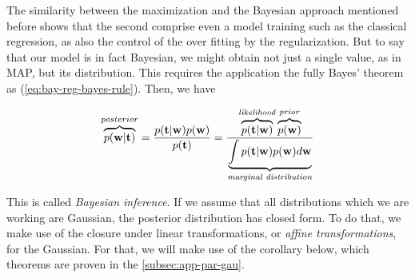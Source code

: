 \documentclass[11pt]{article} %
\begin{document}
The similarity between the maximization and the Bayesian approach mentioned before shows that the second comprise even a model training such as the classical regression, as also the control of the over fitting by the regularization. But to say that our model is in fact Bayesian, we might obtain not just a single value, as in MAP, but its distribution. This requires the application the fully Bayes' theorem as (\ref{eq:bay-reg-bayes-rule}). Then, we have

\begin{equation}
   \overbrace{p(\mathbf{w}|\mathbf{t})}^{posterior} = \frac{p(\mathbf{t}|\mathbf{w}) p(\mathbf{w})}{p(\mathbf{t})} = \frac{\overbrace{p(\mathbf{t}|\mathbf{w})}^{\text{\textit{likelihood}}} \overbrace{p(\mathbf{w})}^{\text{\textit{prior}}}}{\underbrace{\int p(\mathbf{t}|\mathbf{w}) p(\mathbf{w}) d\mathbf{w}}_{\text{\textit{marginal distribution}}}}
\end{equation}

This is called \textit{Bayesian inference}. If we assume that all distributions which we are working are Gaussian, the posterior distribution has closed form. To do that, we make use of the closure under linear transformations, or \textit{affine transformations}, for the Gaussian. For that, we will make use of the corollary below, which theorems are proven in the \autoref{subsec:app-par-gau}.
\end{document}

